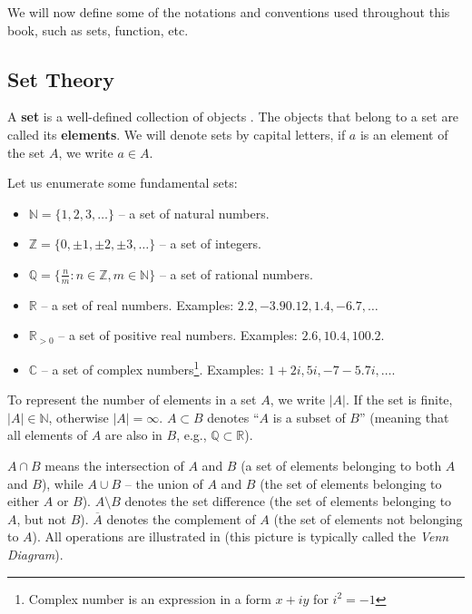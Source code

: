 \documentclass[../lecture-notes-148x210.tex]{subfiles}
\begin{document}
We will now define some of the notations and conventions used throughout this book, such as sets, function, etc.

\subsection*{Set Theory}

A \textbf{set} is a well-defined collection of objects \cite[section 1]{Judson_2012}. The objects that belong to a set are called 
its \textbf{elements}. We will denote sets by capital letters, if $a$ is an element of the set $A$, 
we write $a \in A$.

Let us enumerate some fundamental sets:

\begin{itemize}
    \item $\mathbb{N} = \{1, 2, 3, \dots\}$ -- a set of natural numbers.
    \item $\mathbb{Z} = \{0, \pm 1, \pm 2, \pm 3, \dots\}$ -- a set of integers.
    \item $\mathbb{Q} = \{\frac{n}{m}: n \in \mathbb{Z}, m \in \mathbb{N}\}$ -- a set of rational numbers.
    \item $\mathbb{R}$ -- a set of real numbers. Examples: $2.2, -3.9 0.12, 1.4, -6.7, \dots$
    \item $\mathbb{R}_{>0}$ -- a set of positive real numbers. Examples: $2.6, 10.4, 100.2$.
    \item $\mathbb{C}$ -- a set of complex numbers\footnote{Complex number is an expression in a form $x+iy$ for $i^2=-1$}. 
    Examples: $1+2i, 5i, -7-5.7i, \dots$.
\end{itemize}

To represent the number of elements in a set $A$, we write $|A|$. If the set is finite, $|A| \in \mathbb{N}$, 
otherwise $|A| = \infty$. $A \subset B$ denotes ``$A$ is a subset of $B$'' (meaning that all elements of $A$ 
are also in $B$, e.g., $\mathbb{Q} \subset \mathbb{R}$).

$A \cap B$ means the intersection of $A$ and $B$ (a set of elements belonging to both $A$ and $B$), while 
$A \cup B$ -- the union of $A$ and $B$ (the set of elements belonging to either $A$ or $B$). $A \setminus B$ 
denotes the set difference (the set of elements belonging to $A$, but not $B$). $\overline{A}$ denotes the 
complement of $A$ (the set of elements not belonging to $A$). All operations are illustrated in 
 (this picture is typically called the \textit{Venn Diagram}).
\end{document}
